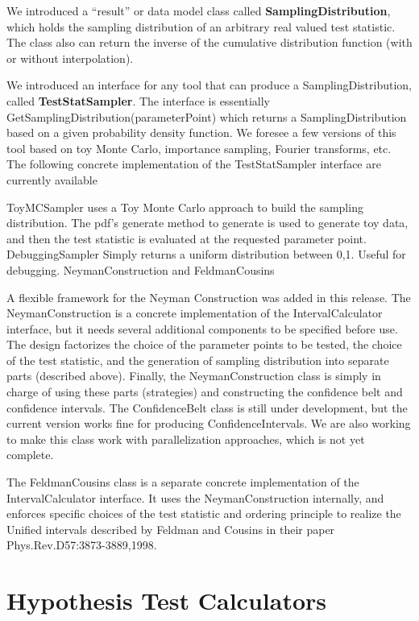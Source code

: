 \documentclass[11pt]{article}
\begin{document}
We introduced a ``result'' or data model class called \textbf{SamplingDistribution}, which holds the sampling distribution of an arbitrary real valued test statistic.  The class also can return the inverse of the cumulative distribution function (with or without interpolation).  

We introduced an interface for any tool that can produce a SamplingDistribution, called \textbf{TestStatSampler}.  The interface is essentially GetSamplingDistribution(parameterPoint) which returns a SamplingDistribution based on a given probability density function.  We foresee a few versions of this tool based on toy Monte Carlo, importance sampling, Fourier transforms, etc.  The following concrete implementation of the TestStatSampler interface are currently available

ToyMCSampler uses a Toy Monte Carlo approach to build the sampling distribution.  The pdf's generate method to generate is used to generate toy data, and then the test statistic is evaluated at the requested parameter point.
DebuggingSampler Simply returns a uniform distribution between 0,1.  Useful for debugging.
NeymanConstruction and FeldmanCousins

A flexible framework for the Neyman Construction was added in this release. The NeymanConstruction is a concrete implementation of the IntervalCalculator interface, but it needs several additional components to be specified before use. The design factorizes the choice of the parameter points to be tested, the choice of the test statistic, and the generation of sampling distribution into separate parts (described above).  Finally, the NeymanConstruction class is simply in charge of using these parts (strategies) and constructing the confidence belt and confidence intervals.  The ConfidenceBelt class is still under development, but the current version works fine for producing ConfidenceIntervals.  We are also working to make this class work with parallelization approaches, which is not yet complete.

The FeldmanCousins class is a separate concrete implementation of the IntervalCalculator interface.  It uses the NeymanConstruction internally, and enforces specific choices of the test statistic and ordering principle to realize the Unified intervals described by Feldman and Cousins in their paper Phys.Rev.D57:3873-3889,1998.


\section{Hypothesis Test Calculators}
\end{document}
